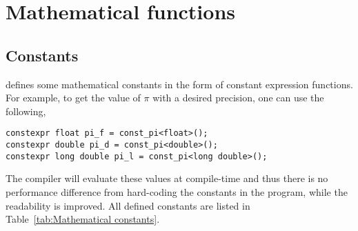%
%
%
%

\chapter{Mathematical functions}
\label{chap:Mathemtical functions}

\section{Constants}
\label{sec:Constants}

\mckl defines some mathematical constants in the form of constant expression
functions. For example, to get the value of $\pi$ with a desired precision, one
can use the following,
\begin{Verbatim}
constexpr float pi_f = const_pi<float>();
constexpr double pi_d = const_pi<double>();
constexpr long double pi_l = const_pi<long double>();
\end{Verbatim}
The compiler will evaluate these values at compile-time and thus there is no
performance difference from hard-coding the constants in the program, while the
readability is improved. All defined constants are listed in
Table~\ref{tab:Mathematical constants}.

